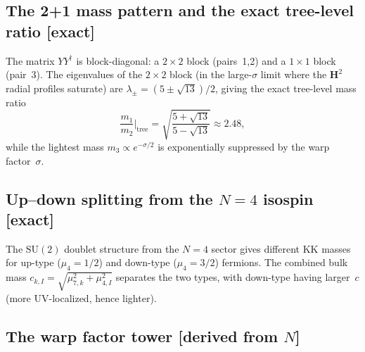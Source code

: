 \subsection{The 2+1 mass pattern and the exact tree-level ratio \textnormal{[exact]}}

The matrix $YY^\dagger$ is block-diagonal:
a $2 \times 2$ block (pairs~1,2) and a $1 \times 1$ block (pair~3).
The eigenvalues of the $2 \times 2$ block
(in the large-$\sigma$ limit where the $\mathbf{H}^2$ radial profiles saturate) are
$\lambda_\pm = (5 \pm \sqrt{13})/2$,
giving the exact tree-level mass ratio
\begin{equation}\label{eq:tree-ratio}
  \frac{m_1}{m_2}\bigg|_{\mathrm{tree}}
  = \sqrt{\frac{5 + \sqrt{13}}{5 - \sqrt{13}}}
  \approx 2.48,
\end{equation}
while the lightest mass $m_3 \propto e^{-\sigma/2}$ is
exponentially suppressed by the warp factor~$\sigma$.

\subsection{Up--down splitting from the $N = 4$ isospin \textnormal{[exact]}}
\label{sec:up-down}

The $\mathrm{SU}(2)$ doublet structure from the $N = 4$ sector
gives different KK masses for up-type ($\mu_4 = 1/2$) and
down-type ($\mu_4 = 3/2$) fermions.
The combined bulk mass $c_{k,I} = \sqrt{\mu_{7,k}^2 + \mu_{4,I}^2}$
separates the two types, with down-type having larger~$c$
(more UV-localized, hence lighter).

\subsection{The warp factor tower \textnormal{[derived from $N$]}}
\label{sec:warp-tower}

